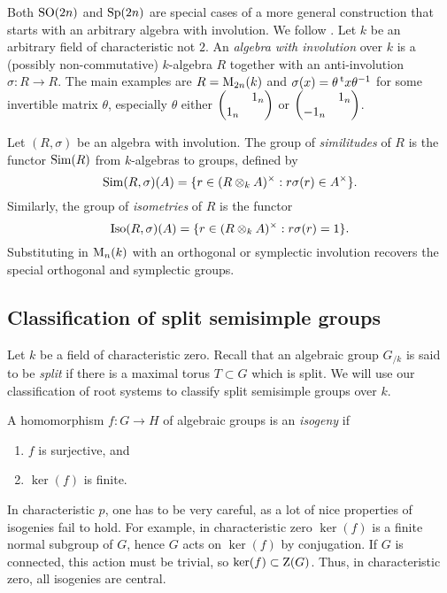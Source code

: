 \begin{hard}
Both $\operatorname{SO}(2n)$ and $\operatorname{Sp}(2n)$ are special cases of a more general construction 
that starts with an arbitrary algebra with involution. We follow 
\cite[VIII.21]{berhuy-2010}. Let $k$ be an arbitrary field of characteristic 
not $2$. An \emph{algebra with involution} over $k$ is a (possibly 
non-commutative) $k$-algebra $R$ together with an anti-involution 
$\sigma:R\to R$. The main examples are $R=\operatorname{M}_{2n}(k)$ and 
$\sigma(x) = \theta \prescript{\mathrm{t}}{}{x} \theta^{-1}$ for some invertible matrix 
$\theta$, especially $\theta$ either $\begin{pmatrix}  & 1_n \\ 1_n &  \end{pmatrix}$ or 
$\begin{pmatrix}  & 1_n \\ -1_n &  \end{pmatrix}$. 

Let $(R,\sigma)$ be an algebra with involution. The group of 
\emph{similitudes} of $R$ is the functor $\operatorname{Sim}(R)$ from $k$-algebras to 
groups, defined by 
\[
  \operatorname{Sim}(R,\sigma)(A) = \{r\in (R\otimes_k A)^\times:r\sigma(r)\in A^\times\} .
\]
Similarly, the group of \emph{isometries} of $R$ is the functor 
\[
  \operatorname{Iso}(R,\sigma)(A) =  \{r\in (R\otimes_k A)^\times:r\sigma(r)=1\} .
\]
Substituting in $\operatorname{M}_n(k)$ with an orthogonal or symplectic involution 
recovers the special orthogonal and symplectic groups. 
\end{hard}





\subsection{Classification of split semisimple groups}\label{sec:semisimple-classify}

Let $k$ be a field of characteristic zero. Recall that an algebraic group 
$G_{/k}$ is said to be \emph{split} if there is a maximal torus $T\subset G$ 
which is split. We will use our classification of root systems to classify 
split semisimple groups over $k$. 

\begin{definition}
A homomorphism $f:G\to H$ of algebraic groups is an \emph{isogeny} if 
\begin{enumerate}
  \item $f$ is surjective, and 
  \item $\ker(f)$ is finite. 
\end{enumerate}
\end{definition}

In characteristic $p$, one has to be very careful, as a lot of nice properties 
of isogenies fail to hold. For example, in characteristic zero $\ker(f)$ is a 
finite normal subgroup of $G$, hence $G$ acts on $\ker(f)$ by conjugation. If 
$G$ is connected, this action must be trivial, so $\ker(f)\subset \operatorname{Z}(G)$. 
Thus, in characteristic zero, all isogenies are central. 

